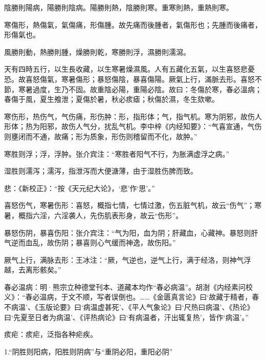 \documentclass[12pt]{ctexbook}
\begin{document}

\begin{yuanwen}
陰勝則陽病，陽勝則陰病。陽勝則熱，陰勝則寒。重寒則熱，重熱則寒。

寒傷形，熱傷氣，氣傷痛，形傷腫。故先痛而後腫者，氣傷形也；先腫而後痛者，形傷氣也。

風勝則動，熱勝則腫，燥勝則乾，寒勝則浮，濕勝則濡瀉。

天有四時五行，以生長收藏，以生寒暑燥濕風。人有五藏化五氣，以生喜怒悲憂恐。故喜怒傷氣，寒暑傷形；暴怒傷陰，暴喜傷陽。厥氣上行，滿脈去形。喜怒不節，寒暑過度，生乃不固。故重陰必陽，重陽必陰。故曰：冬傷於寒，春必溫病；春傷于風，夏生飧泄；夏傷於暑，秋必痎瘧；秋傷於濕，冬生欬嗽。
\end{yuanwen}


\begin{jiaozhu}
  \item 寒伤形，热伤气，气伤痛，形伤肿：形，指形体；气，指气机。寒为阴邪，故伤人形体；热为阳邪，故伤人气分，扰乱气机。李中梓《内经知要》：“气喜宣通，气伤则壅闭而不通，故痛；形为质象，形伤则稽留而不化，故肿。”
  \item 寒胜则浮；浮，浮肿。张介宾注：“寒胜者阳气不行，为胀满虚浮之病。”
  \item 湿胜则濡泻；濡泻，指泄泻而大便溏薄，由于湿胜伤脾而致。
  \item 悲：《新校正》：“按《天元纪大论》，‘悲’作‘思’。”
  \item 喜怒伤气，寒暑伤形：喜怒，概指七情，七情过激，伤五脏气机，故云“伤气”；寒暑，概指六淫，六淫袭人，先伤肌表形身，故云“伤形”。
  \item 暴怒伤阴，暴喜伤阳：张介宾注：“气为阳，血为阴；肝藏血，心藏神。暴怒则肝气逆而血乱，故伤阴；暴喜则心气缓而神逸，故伤阳。”
  \item 厥气上行，满脉去形：王冰注：“厥，气逆也，逆气上行，满于经洛，则神气浮越，去离形骸矣。”
  \item 春必温病：明·熊宗立种德堂刊本、道藏本均作“春必病温”。胡澍《内经素问校义》：“春必温病，于文不顺，写者误倒也。……《金匮真言论》曰‘故藏于精者，春不病温’、《玉版论要》曰‘病温虚甚死’、《平人气象论》曰‘尺热曰病温’、《热论》曰‘先夏至日者为病温’、《评热病论》曰‘有病温者，汗出辄复热’，皆作‘病温’。”
  \item 痎疟：痎疟，泛指各种疟疾。
\end{jiaozhu}


1.“阴胜则阳病，阳胜则阴病”与“重阴必阳，重阳必阴”
\end{document}
